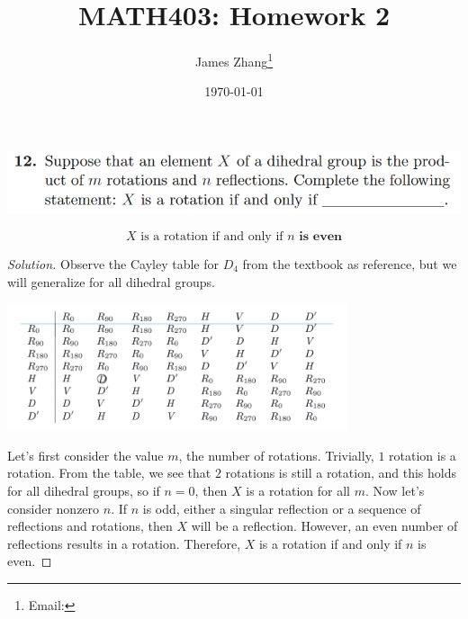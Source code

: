 \documentclass[12pt]{scrartcl}
\begin{document}
\title{MATH403: Homework 2}
\author{James Zhang\thanks{Email: }}
\date{\today}



\maketitle

\includegraphics[width=14cm]{12.png}

\[ X \text{ is a rotation if and only if } \textbf{$n$ is even}\]

\begin{proof}[Solution]
  Observe the Cayley table for $D_4$ from the textbook as reference, but we will generalize for all 
  dihedral groups. 

  \begin{center}
    \includegraphics[width=10cm]{d4table.png}
  \end{center}

  Let's first consider the value $m$, the number of rotations. Trivially, $1$ rotation 
  is a rotation. From the table, we see that $2$ rotations is still a rotation, and this holds for all 
  dihedral groups, so if $n=0$, then $X$ is a rotation for all $m$. Now let's consider 
  nonzero $n$. If $n$ is odd, either a singular reflection or a sequence of reflections and rotations, 
  then $X$ will be a reflection. However, an even number of reflections results in a rotation. Therefore, 
  $X$ is a rotation if and only if $n$ is even. 
\end{proof}
\end{document}
